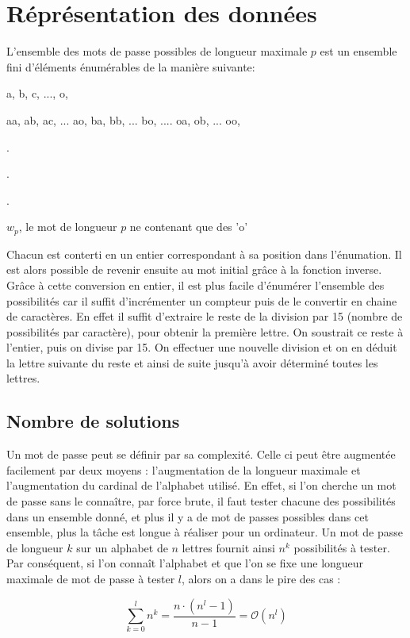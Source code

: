 \documentclass[a4paper,11pt]{article}
\begin{document}
\section{Réprésentation des données}
L'ensemble des mots de passe possibles de longueur maximale $p$ est un ensemble fini d'éléments énumérables  de la manière suivante:
\begin{itemise}
\item a, b, c, ..., o,
\item aa, ab, ac, ... ao, ba, bb, ... bo, .... oa, ob, ... oo,
\item .
\item .
\item .
\item $w_{p}$, le mot de longueur $p$ ne contenant que des 'o'
\end{itemise}
Chacun est conterti en un entier correspondant à sa position dans l'énumation. Il est alors possible de revenir ensuite au mot initial grâce à la fonction inverse. Grâce à cette conversion en entier, il est plus facile d'énumérer l'ensemble des possibilités car il suffit d'incrémenter un compteur puis de le convertir en chaine de caractères. En effet il suffit d'extraire le reste de la division par 15 (nombre de possibilités par caractère), pour obtenir la première lettre. On soustrait ce reste à l'entier, puis on divise par 15. On effectuer une nouvelle division et on en déduit la lettre suivante du reste et ainsi de suite jusqu'à avoir déterminé toutes les lettres.


\subsection{Nombre de solutions}

Un mot de passe peut se définir par sa complexité. Celle ci peut être augmentée facilement par deux moyens : l'augmentation de la longueur maximale et l'augmentation du cardinal de l'alphabet utilisé. En effet, si l'on cherche un mot de passe sans le connaître, par force brute, il faut tester chacune des possibilités dans un ensemble donné, et plus il y a de mot de passes possibles dans cet ensemble, plus la tâche est longue à réaliser pour un ordinateur. Un mot de passe de longueur $k$ sur un alphabet de $n$ lettres fournit ainsi $n^k$ possibilités à tester. Par conséquent, si l'on connaît l'alphabet et que l'on se fixe une longueur maximale de mot de passe à tester $l$, alors on a dans le pire des cas :

\[
\sum_{k=0}^{l}n^k = \frac{n \cdot (n^l - 1)}{n - 1} = \mathcal{O}(n^l)
\]
\end{document}
